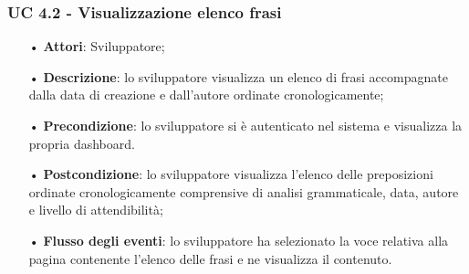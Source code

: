 \subsubsection{UC 4.2 - Visualizzazione elenco frasi}
\begin{itemize}
	\item[•]\textbf{Attori}: Sviluppatore;
	\item[•]\textbf{Descrizione}: lo sviluppatore visualizza un elenco di frasi accompagnate 
	dalla data di creazione e dall’autore ordinate cronologicamente;
	\item[•]\textbf{Precondizione}:  lo sviluppatore si è autenticato nel sistema e visualizza la propria dashboard.
	\item[•]\textbf{Postcondizione}: lo sviluppatore visualizza l'elenco delle preposizioni ordinate cronologicamente comprensive di analisi grammaticale, data, autore e livello di attendibilità;
	\item[•]\textbf{Flusso degli eventi}: lo sviluppatore ha selezionato la voce relativa alla pagina contenente l’elenco delle frasi e ne visualizza il contenuto. 
\end{itemize}
